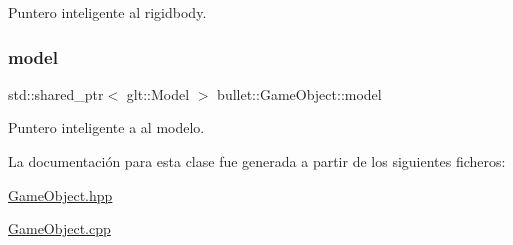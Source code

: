 Puntero inteligente al rigidbody. 

\mbox{\label{classbullet_1_1_game_object_ae71680005e5766a0f16617ad6c84ba5b}} 
\subsubsection{\texorpdfstring{model}{model}}
{\footnotesize\ttfamily std\+::shared\+\_\+ptr$<$ glt\+::\+Model $>$ bullet\+::\+Game\+Object\+::model}



Puntero inteligente a al modelo. 



La documentación para esta clase fue generada a partir de los siguientes ficheros\+:\begin{DoxyCompactItemize}
\item 
\mbox{\hyperlink{_game_object_8hpp}{Game\+Object.\+hpp}}\item 
\mbox{\hyperlink{_game_object_8cpp}{Game\+Object.\+cpp}}\end{DoxyCompactItemize}
